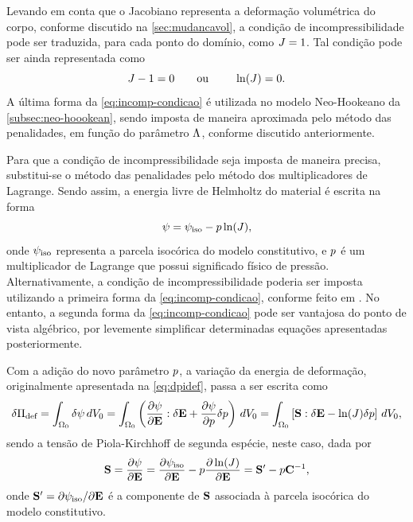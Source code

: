 \documentclass[Tese.tex]{subfiles}
\begin{document}
Levando em conta que o Jacobiano representa a deformação volumétrica do corpo, conforme discutido na \autoref{sec:mudancavol}, a condição de incompressibilidade pode ser traduzida, para cada ponto do domínio, como $\J=1$. Tal condição pode ser ainda representada como
\begin{equation}\label{eq:incomp-condicao}
\J-1=0\text{\qquad ou \qquad} \ln(\J) = 0.
\end{equation}
A última forma da \cref{eq:incomp-condicao} é utilizada no modelo Neo-Hookeano da \autoref{subsec:neo-hoookean}, sendo imposta de maneira aproximada pelo método das penalidades, em função do parâmetro $\lame$, conforme discutido anteriormente.

Para que a condição de incompressibilidade seja imposta de maneira precisa, substitui-se o método das penalidades pelo método dos multiplicadores de Lagrange. Sendo assim, a energia livre de Helmholtz do material é escrita na forma
\begin{equation}\label{eq:helmholtz-incomp}
\helmholtz = \helmholtziso - \p \ln(\J),
\end{equation}
onde $\helmholtziso$ representa a parcela isocórica do modelo constitutivo, e $\p$ é um multiplicador de Lagrange que possui significado físico de pressão. Alternativamente, a condição de incompressibilidade poderia ser imposta utilizando a primeira forma da \cref{eq:incomp-condicao}, conforme feito em . No entanto, a segunda forma da \cref{eq:incomp-condicao} pode ser vantajosa do ponto de vista algébrico, por levemente simplificar determinadas equações apresentadas posteriormente.

Com a adição do novo parâmetro $\p$, a variação da energia de deformação, originalmente apresentada na \cref{eq:dpidef}, passa a ser escrita como
\begin{equation}\label{eq:dpidef-p}
\delta\Energiadef = \int_{\domVoli}\delta\helmholtz\,d\voli = \int_{\domVoli}\left(\dfrac{\partial\helmholtz}{\partial\E}:\delta\E + \dfrac{\partial\helmholtz}{\partial\p}\delta\p\right)\,d\voli = \int_{\domVoli}\left[\S:\delta\E - \ln(\J)\delta\p \right]
\,d\voli,
\end{equation}
sendo a tensão de Piola-Kirchhoff de segunda espécie, neste caso, dada por
\begin{equation}
\S = \dfrac{\partial \helmholtz}{\partial \E} = \dfrac{\partial \helmholtziso}{\partial \E} - p\dfrac{\partial \ln(\J)}{\partial \E} = \Siso - p\C^{-1},
\end{equation}
onde $\Siso = {\partial \helmholtziso}/{\partial \E}$ é a componente de $\S$ associada à parcela isocórica do modelo constitutivo.
\end{document}

